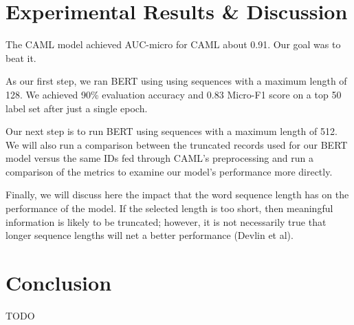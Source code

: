 \documentclass[fleqn,10pt]{olplainarticle}
\begin{document}
\section{Experimental Results \& Discussion}
The CAML model achieved AUC-micro for CAML about 0.91. Our goal was to beat it.

As our first step, we ran BERT using using sequences with a maximum length of 128. We achieved 90\% evaluation accuracy and 0.83 Micro-F1 score on a top 50 label set after just a single epoch.

Our next step is to run BERT using sequences with a maximum length of 512. We will also  run a comparison between the truncated records used for our BERT model versus the same IDs fed through CAML’s preprocessing and run a comparison of the metrics to examine our model’s performance more directly.

Finally, we will discuss here the impact that the word sequence length has on the performance of the model. If the selected length is too short, then meaningful information is likely to be truncated; however, it is not necessarily true that longer sequence lengths will net a better performance (Devlin et al).


\section{Conclusion}
TODO




\end{document}
